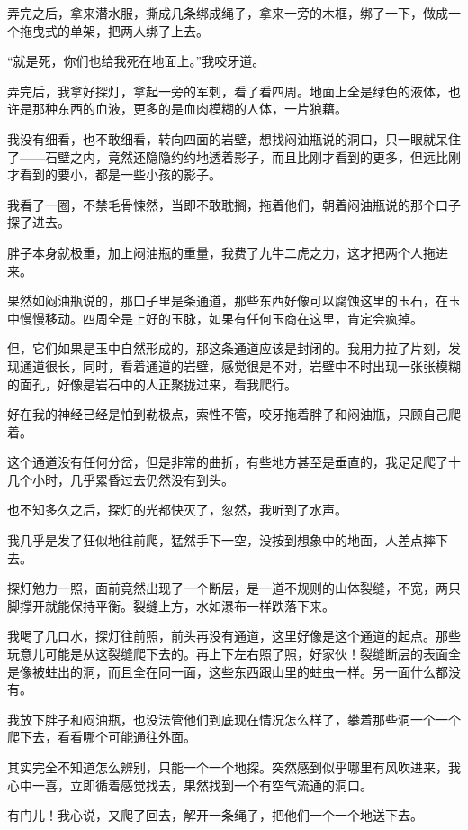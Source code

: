 弄完之后，拿来潜水服，撕成几条绑成绳子，拿来一旁的木框，绑了一下，做成一个拖曳式的单架，把两人绑了上去。

“就是死，你们也给我死在地面上。”我咬牙道。

弄完后，我拿好探灯，拿起一旁的军刺，看了看四周。地面上全是绿色的液体，也许是那种东西的血液，更多的是血肉模糊的人体，一片狼藉。

我没有细看，也不敢细看，转向四面的岩壁，想找闷油瓶说的洞口，只一眼就呆住了——石壁之内，竟然还隐隐约约地透着影子，而且比刚才看到的更多，但远比刚才看到的要小，都是一些小孩的影子。

我看了一圈，不禁毛骨悚然，当即不敢耽搁，拖着他们，朝着闷油瓶说的那个口子探了进去。

胖子本身就极重，加上闷油瓶的重量，我费了九牛二虎之力，这才把两个人拖进来。

果然如闷油瓶说的，那口子里是条通道，那些东西好像可以腐蚀这里的玉石，在玉中慢慢移动。四周全是上好的玉脉，如果有任何玉商在这里，肯定会疯掉。

但，它们如果是玉中自然形成的，那这条通道应该是封闭的。我用力拉了片刻，发现通道很长，同时，看着通道的岩壁，感觉很是不对，岩壁中不时出现一张张模糊的面孔，好像是岩石中的人正聚拢过来，看我爬行。

好在我的神经已经是怕到勒极点，索性不管，咬牙拖着胖子和闷油瓶，只顾自己爬着。

这个通道没有任何分岔，但是非常的曲折，有些地方甚至是垂直的，我足足爬了十几个小时，几乎累昏过去仍然没有到头。

也不知多久之后，探灯的光都快灭了，忽然，我听到了水声。

我几乎是发了狂似地往前爬，猛然手下一空，没按到想象中的地面，人差点摔下去。

探灯勉力一照，面前竟然出现了一个断层，是一道不规则的山体裂缝，不宽，两只脚撑开就能保持平衡。裂缝上方，水如瀑布一样跌落下来。

我喝了几口水，探灯往前照，前头再没有通道，这里好像是这个通道的起点。那些玩意儿可能是从这裂缝爬下去的。再上下左右照了照，好家伙！裂缝断层的表面全是像被蛀出的洞，而且全在同一面，这些东西跟山里的蛀虫一样。另一面什么都没有。

我放下胖子和闷油瓶，也没法管他们到底现在情况怎么样了，攀着那些洞一个一个爬下去，看看哪个可能通往外面。

其实完全不知道怎么辨别，只能一个一个地探。突然感到似乎哪里有风吹进来，我心中一喜，立即循着感觉找去，果然找到一个有空气流通的洞口。

有门儿！我心说，又爬了回去，解开一条绳子，把他们一个一个地送下去。

